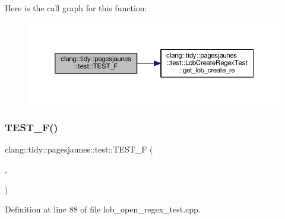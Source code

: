 Here is the call graph for this function\+:
\nopagebreak
\begin{figure}[H]
\begin{center}
\leavevmode
\includegraphics[width=350pt]{namespaceclang_1_1tidy_1_1pagesjaunes_1_1test_aa0c1e4b3b995955cbb442e3301eaff74_cgraph}
\end{center}
\end{figure}
\mbox{\label{namespaceclang_1_1tidy_1_1pagesjaunes_1_1test_a48fef03720771a873ebb79ccee257d07}} 
\subsubsection{\texorpdfstring{T\+E\+S\+T\+\_\+\+F()}{TEST\_F()}\hspace{0.1cm}{\footnotesize\ttfamily [25/57]}}
{\footnotesize\ttfamily clang\+::tidy\+::pagesjaunes\+::test\+::\+T\+E\+S\+T\+\_\+F (\begin{DoxyParamCaption}\item[{\hyperlink{classclang_1_1tidy_1_1pagesjaunes_1_1test_1_1_lob_open_regex_test}{Lob\+Open\+Regex\+Test}}]{,  }\item[{Regex\+Matching\+Weird\+Syntax}]{ }\end{DoxyParamCaption})}



Definition at line 88 of file lob\+\_\+open\+\_\+regex\+\_\+test.\+cpp.


